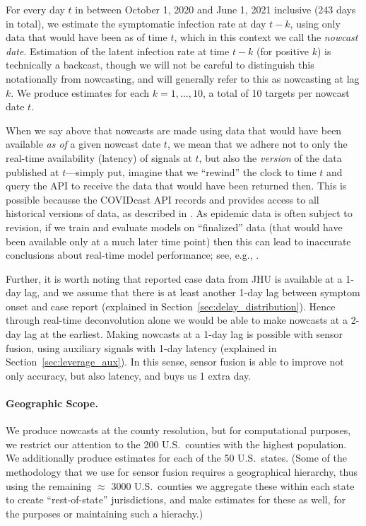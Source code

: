 \documentclass[sts]{imsart}
\theoremstyle{plain}
\theoremstyle{definition}
\theoremstyle{remark}
\begin{document}
For every day $t$ in between October 1, 2020 and June 1, 2021 inclusive (243
days in total), we estimate the symptomatic infection rate at day $t-k$, using  
only data that would have been as of time $t$, which in this context we call the  
\emph{nowcast date}. Estimation of the latent infection rate at time $t-k$ (for
positive $k$) is technically a backcast, though we will not be careful to
distinguish this notationally from nowcasting, and will generally refer to this
as nowcasting at lag $k$. We produce estimates for each $k=1,\ldots,10$, a total  
of 10 targets per nowcast date $t$. 

When we say above that nowcasts are made using data that would have been
available \emph{as of} a given nowcast date $t$, we mean that we adhere not to
only the real-time availability (latency) of signals at $t$, but also the
\emph{version} of the data published at $t$---simply put, imagine that we
``rewind'' the clock to time $t$ and query the API to receive the data that
would have been returned then. This is possible becausse the COVIDcast API
records and provides access to all historical versions of data, as described in
\citet{Reinhart:2021}. As epidemic data is often subject to revision, if we
train and evaluate models on ``finalized'' data (that would have been available
only at a much later time point) then this can lead to inaccurate conclusions
about real-time model performance; see, e.g., \citet{McDonald:2021}.

Further, it is worth noting that reported case data from JHU is available at a
1-day lag, and we assume that there is at least another 1-day lag between
symptom onset and case report (explained in
Section~\ref{sec:delay_distribution}). Hence through real-time deconvolution
alone we would be able to make nowcasts at a 2-day lag at the earliest. Making
nowcasts at a 1-day lag is possible with sensor fusion, using auxiliary signals 
with 1-day latency (explained in Section~\ref{sec:leverage_aux}). In this sense,
sensor fusion is able to improve not only accuracy, but also latency, and buys
us 1 extra day. 

\smallskip
\paragraph*{Geographic Scope.}

We produce nowcasts at the county resolution, but for computational purposes, we
restrict our attention to the 200 U.S.\ counties with the highest
population. We additionally produce estimates for each of the 50 U.S.\ states. 
(Some of the methodology that we use for sensor fusion requires a geographical
hierarchy, thus using the remaining $\approx$ 3000 U.S.\ counties we aggregate
these within each state to create ``rest-of-state'' jurisdictions, and make
estimates for these as well, for the purposes or maintaining such a hierachy.) 
\end{document}
